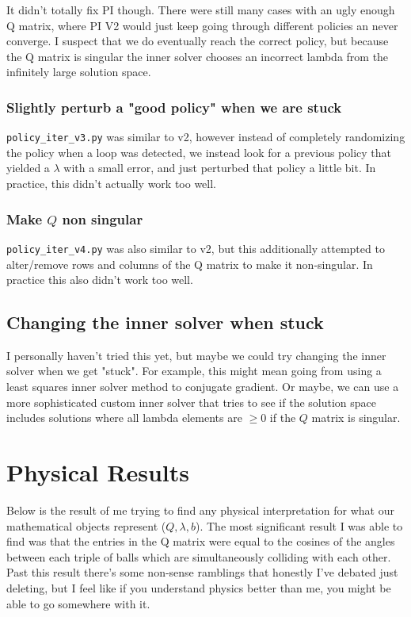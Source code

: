 \documentclass[12pt]{article}
\begin{document}
It didn't totally fix PI though. There were still many cases with an
ugly enough Q matrix, where PI V2 would just keep going through different policies an never converge.
I suspect that we do eventually reach the correct policy, but because the Q matrix is singular
the inner solver chooses an incorrect lambda from the infinitely large solution space.

\subsubsection{Slightly perturb a "good policy" when we are stuck}

\texttt{policy\_iter\_v3.py} was similar to v2, however instead of completely randomizing
the policy when a loop was detected, we instead look for a previous policy that yielded a $\lambda$
with a small error, and just perturbed that policy a little bit.
In practice, this didn't actually work too well.

\subsubsection{Make $Q$ non singular}


\texttt{policy\_iter\_v4.py} was also similar to v2, but this additionally attempted to alter/remove
rows and columns of the Q matrix to make it non-singular. In practice this also didn't work too well.

\subsection{Changing the inner solver when stuck}

I personally haven't tried this yet,
but maybe we could try changing the inner solver when we get "stuck".
For example, this might mean going from using a least squares inner solver method to conjugate gradient.
Or maybe, we can use a more sophisticated custom inner solver that tries to see if the
solution space includes solutions where all lambda elements are $\geq 0$ if the $Q$ matrix
is singular.

\section{Physical Results}

Below is the result of me trying to find any physical interpretation for what our mathematical objects represent ($Q, \lambda, b$).
The most significant result I was able to find was that the entries in the Q matrix were equal to the cosines of the
angles between each triple of balls which are simultaneously colliding with each other.
Past this result there's some non-sense ramblings that honestly I've debated just deleting, but I feel like if you
understand physics better than me, you might be able to go somewhere with it.
\end{document}
